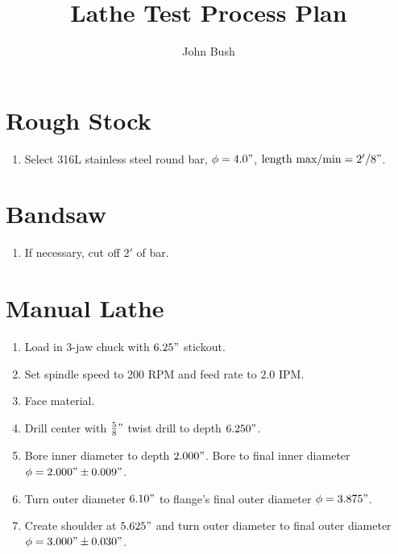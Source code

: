 \documentclass{article}
\begin{document}
\title{Lathe Test Process Plan}
\author{John Bush}

\maketitle

\section*{Rough Stock}

\begin{enumerate}
	\item Select 316L stainless steel round bar, $\phi = 4.0"$, $\text{length max/min} = 2'/8"$.
\end{enumerate}

\section*{Bandsaw}

\begin{enumerate}[resume]
	\item If necessary, cut off $2'$ of bar.
\end{enumerate}

\section*{Manual Lathe}

\begin{enumerate}[resume]
	\item Load in 3-jaw chuck with $6.25"$ stickout.

	\item Set spindle speed to 200 RPM and feed rate to $2.0$ IPM.

	\item Face material.

	\item Drill center with $\frac{5}{8}"$ twist drill to depth $6.250"$.

	\item Bore inner diameter to depth $2.000"$.  Bore to final inner diameter $\phi = 2.000" \pm 0.009"$.

	\item Turn outer diameter $6.10"$ to flange's final outer diameter $\phi = 3.875"$.

	\item Create shoulder at $5.625"$ and turn outer diameter to final outer diameter $\phi = 3.000" \pm 0.030"$.
\end{enumerate}
\end{document}
